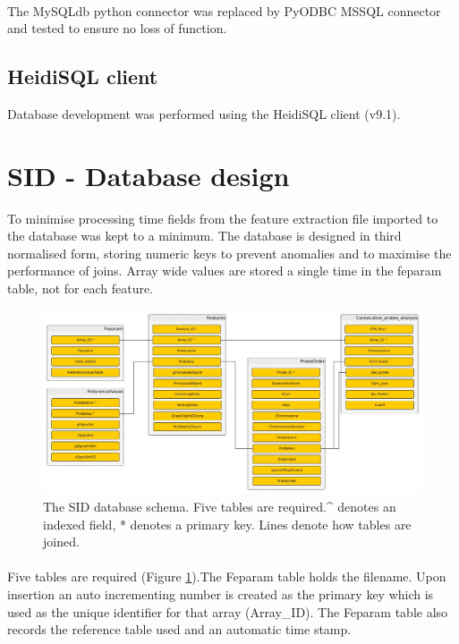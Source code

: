 \paragraph*{}
The MySQLdb python connector was replaced by PyODBC MSSQL connector \cite{pyodbc_mkleehammer/pyodbc_????} and tested to ensure no loss of function.

\subsection{HeidiSQL client}
Database development was performed using the HeidiSQL client (v9.1)\cite{heidisql_heidisql_2016}.

\section{SID - Database design}
To minimise processing time fields from the feature extraction file imported to the database was kept to a minimum. The database is designed in third normalised form, storing numeric keys to prevent anomalies and to maximise the performance of joins. Array wide values are stored a single time in the feparam table, not for each feature.
\begin{figure}
\centering
\includegraphics[width=1\linewidth]{./Figures/SIDdbschema-simple}
\caption[The SID database schema]{The SID database schema. Five tables are required.\string^ denotes an indexed field, * denotes a primary key. Lines denote how tables are joined.}
\label{fig:SIDdbschema-simple}
\end{figure}

\paragraph*{}
Five tables are required (Figure \ref{fig:SIDdbschema-simple}).The Feparam table holds the filename. Upon insertion an auto incrementing number is created as the primary key which is used as the unique identifier for that array (Array\_ID). The Feparam table also records the reference table used  and an automatic time stamp. 
